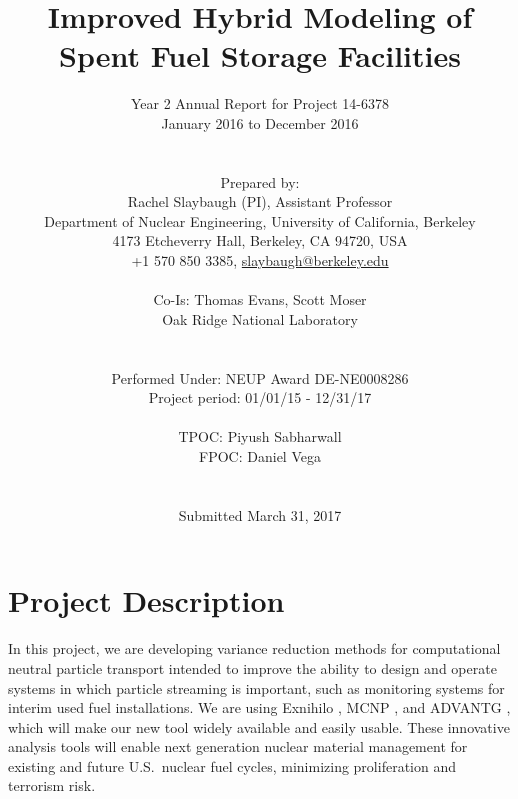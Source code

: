\documentclass[12pt]{article}
\title{Improved Hybrid Modeling of Spent Fuel Storage Facilities}
\author{ 
  Year 2 Annual Report for Project 14-6378\\
  January 2016 to December 2016\\
  \\
  \\
  Prepared by:\\
  Rachel Slaybaugh (PI), Assistant Professor \\
  Department of Nuclear Engineering, University of California, Berkeley \\
  4173 Etcheverry Hall, Berkeley, CA 94720, USA\\
  +1 570 850 3385, 
  \href{mailto:slaybaugh@berkeley.edu}{slaybaugh@berkeley.edu}\\
  \\
 Co-Is: Thomas Evans, Scott Moser\\
  Oak Ridge National Laboratory\\
  \\
  \\
  Performed Under: NEUP Award DE-NE0008286\\
  Project period: 01/01/15 - 12/31/17 \\
  \\
  TPOC: Piyush Sabharwall\\
  FPOC: Daniel Vega\\
  \\
  \\
  Submitted March 31, 2017
}
\begin{document}


\maketitle
\clearpage
\tableofcontents
\clearpage
%

%

\section{Project Description}
\label{sect::project}

In this project, we are developing variance reduction methods for computational neutral particle transport intended to improve the ability to design and operate systems in which particle streaming is important, such as monitoring systems for interim used fuel installations. 
We are using Exnihilo \cite{evans_denovo:_2010}, MCNP \cite{brown_mcnp_2002}, and ADVANTG \cite{mosher_new_2010}, which will make our new tool widely available and easily usable. 
These innovative analysis tools will enable next generation nuclear material management for existing and future U.S.\ nuclear fuel cycles, minimizing proliferation and terrorism risk.
\end{document}
